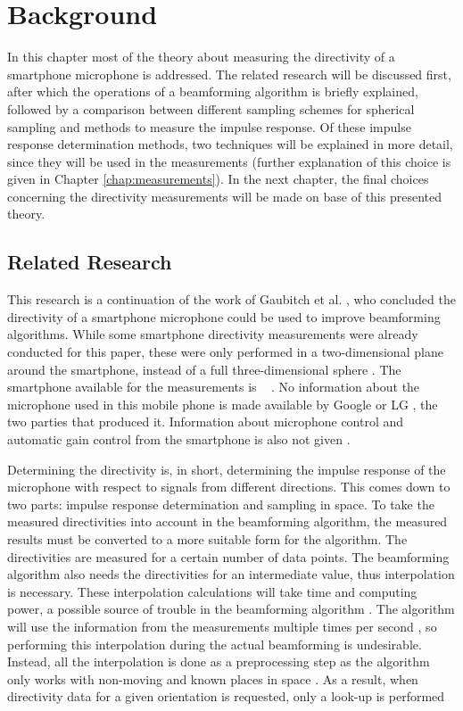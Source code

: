 \chapter{Background}
\label{chap:background}

In this chapter most of the theory about measuring the directivity of a smartphone microphone is addressed.
The related research will be discussed first, after which the operations of a beamforming algorithm is briefly explained, followed by a comparison between different sampling schemes for spherical sampling and methods to measure the impulse response.
Of these impulse response determination methods, two techniques will be explained in more detail, since they will be used in the measurements (further explanation of this choice is given in Chapter \ref{chap:measurements}).
In the next chapter, the final choices concerning the directivity measurements  will be made on base of this presented theory.   

\section{Related Research}
This research is a continuation of the work of Gaubitch et al. \cite{Gaubitch2014}, who concluded the directivity of a smartphone microphone could be used to improve beamforming algorithms.
While some smartphone directivity measurements were already conducted for this paper, these were only performed in a two-dimensional plane around the smartphone, instead of a full three-dimensional sphere \cite{Gaubitch2014}.
The smartphone available for the measurements is \nexus~ \cite{nexus5}.
No information about the microphone used in this mobile phone is made available by Google \cite{nexus5} or LG \cite{nexus5:lg}, the two parties that produced it.
Information about microphone control and automatic gain control from the smartphone is also not given \cite{BAP:RoySjoerd}.

Determining the directivity is, in short, determining the impulse response of the microphone with respect to signals from different directions.
This comes down to two parts: impulse response determination and sampling in space.
To take the measured directivities into account in the beamforming algorithm, the measured results must be converted to a more suitable form for the algorithm.
The directivities are measured for a certain number of data points. The beamforming algorithm also needs the directivities for an intermediate value, thus interpolation is necessary. 
These interpolation calculations will take time and computing power, a possible source of trouble in the beamforming algorithm \cite{BAP:ErikNiels}. 
The algorithm will use the information from the measurements multiple times per second \cite{BAP:ErikNiels}, so performing this interpolation during the actual beamforming is undesirable. Instead, all the interpolation is done as a preprocessing step as the algorithm only works with non-moving and known places in space \cite{BAP:ErikNiels}. As a result, when directivity data for a given orientation is requested, only a look-up is performed

